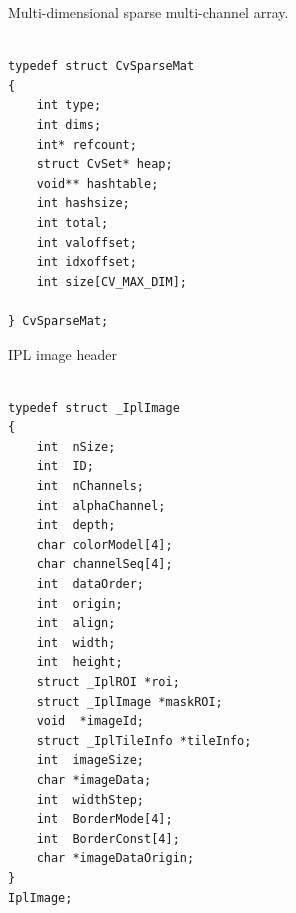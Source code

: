 \begin{description}
\end{description}

\label{CvSparseMat}

Multi-dimensional sparse multi-channel array.

\begin{lstlisting}

typedef struct CvSparseMat
{
    int type;
    int dims; 
    int* refcount; 
    struct CvSet* heap; 
    void** hashtable; 
    int hashsize;
    int total; 
    int valoffset; 
    int idxoffset; 
    int size[CV_MAX_DIM]; 

} CvSparseMat;

\end{lstlisting}

\begin{description}
\end{description}

\label{IplImage}

IPL image header

\begin{lstlisting}

typedef struct _IplImage
{
    int  nSize;         
    int  ID;            
    int  nChannels;     
    int  alphaChannel;  
    int  depth;         
    char colorModel[4]; 
    char channelSeq[4]; 
    int  dataOrder;     
    int  origin;        
    int  align;         
    int  width;         
    int  height;        
    struct _IplROI *roi; 
    struct _IplImage *maskROI; 
    void  *imageId;     
    struct _IplTileInfo *tileInfo; 
    int  imageSize;                             
    char *imageData;  
    int  widthStep;   
    int  BorderMode[4]; 
    int  BorderConst[4]; 
    char *imageDataOrigin; 
}
IplImage;

\end{lstlisting}


